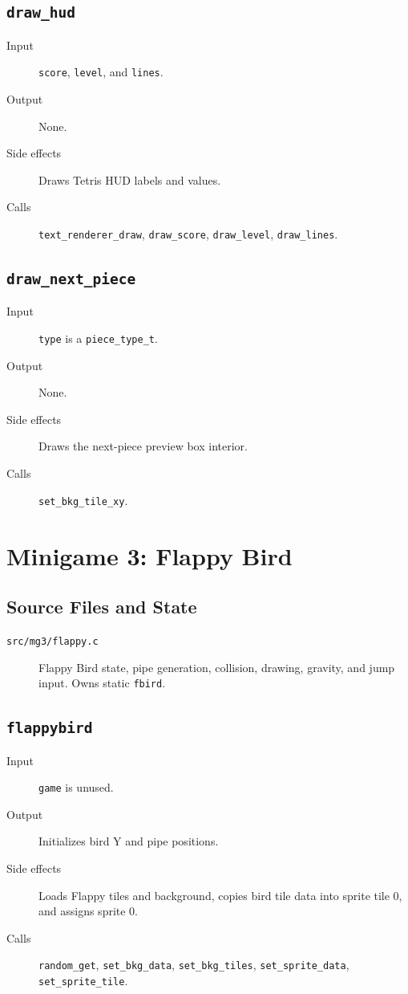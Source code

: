 \subsection*{\texttt{draw\_hud}}
\begin{description}
  \item[Input] \texttt{score}, \texttt{level}, and \texttt{lines}.
  \item[Output] None.
  \item[Side effects] Draws Tetris HUD labels and values.
  \item[Calls] \texttt{text\_renderer\_draw}, \texttt{draw\_score}, \texttt{draw\_level}, \texttt{draw\_lines}.
\end{description}

\subsection*{\texttt{draw\_next\_piece}}
\begin{description}
  \item[Input] \texttt{type} is a \texttt{piece\_type\_t}.
  \item[Output] None.
  \item[Side effects] Draws the next-piece preview box interior.
  \item[Calls] \texttt{set\_bkg\_tile\_xy}.
\end{description}

\section{Minigame 3: Flappy Bird}

\subsection{Source Files and State}

\begin{description}
  \item[\texttt{src/mg3/flappy.c}] Flappy Bird state, pipe generation, collision, drawing, gravity, and jump input. Owns static \texttt{fbird}.
\end{description}

\subsection*{\texttt{flappybird}}
\begin{description}
  \item[Input] \texttt{game} is unused.
  \item[Output] Initializes bird Y and pipe positions.
  \item[Side effects] Loads Flappy tiles and background, copies bird tile data into sprite tile 0, and assigns sprite 0.
  \item[Calls] \texttt{random\_get}, \texttt{set\_bkg\_data}, \texttt{set\_bkg\_tiles}, \texttt{set\_sprite\_data}, \texttt{set\_sprite\_tile}.
\end{description}

